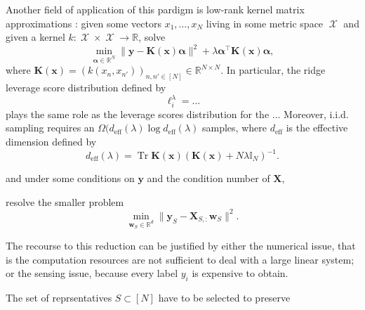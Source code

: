 \documentclass[twoside,11pt]{book}
\numberwithin{theorem}{chapter}
\numberwithin{definition}{chapter}
\numberwithin{proposition}{chapter}
\numberwithin{corollary}{chapter}
\numberwithin{example}{chapter}
\numberwithin{lemma}{chapter}
\numberwithin{assumption}{chapter}
\DeclareMathOperator{\Tr}{Tr}
\DeclareMathOperator{\eff}{\mathrm{eff}}
\DeclareMathOperator{\Tran}{\intercal}
\DeclareMathOperator{\X}{\mathcal{X}}
\begin{document}


Another field of application of this pardigm is low-rank kernel matrix approximations \citep{Bac13,AlMa15}: given some vectors $x_{1}, \dots, x_{N}$ living in some metric space $\X$ and given a kernel $k: \X \times \X \rightarrow \mathbb{R}$, solve
\begin{equation}
\min\limits_{\bm{\alpha} \in \mathbb{R}^{N}} \|\bm{y} - \bm{K}(\bm{x}) \bm{\alpha}\|^{2} + \lambda \bm{\alpha}^{\Tran} \bm{K}(\bm{x}) \bm{\alpha},
\end{equation}
where $\bm{K}(\bm{x}) = (k(x_{n},x_{n'}))_{n,n' \in [N]} \in \mathbb{R}^{N \times N}$. In particular, the ridge leverage score distribution defined by
\begin{equation}
\ell^{\lambda}_{i} = ...
\end{equation}
plays the same role as the leverage scores distribution for the ... Moreover, i.i.d. sampling requires an $\Omega(d_{\eff}(\lambda) \log d_{\eff}(\lambda)$ samples, where $d_{\eff}$ is the effective dimension defined by
\begin{equation}
d_{\eff}(\lambda) = \Tr \bm{K}(\bm{x})(\bm{K}(\bm{x})+ N\lambda \mathbb{I}_{N})^{-1}.
\end{equation}




and under some conditions on $\bm{y}$ and the condition number of $\bm{X}$, 




 resolve the smaller problem
\begin{equation}
\min\limits_{\bm{w}_{S} \in \mathbb{R}^{d}} \| \bm{y}_{S} - \bm{X}_{S,:}\bm{w}_{S} \|^{2}.
\end{equation}

The recourse to this reduction can be justified by either the numerical issue, that is the computation resources are not sufficient to deal with a large linear system; or the sensing issue, because every label $y_{i}$ is expensive to obtain. 

The set of reprsentatives $S \subset [N]$ have to be selected to preserve  



\end{document}
